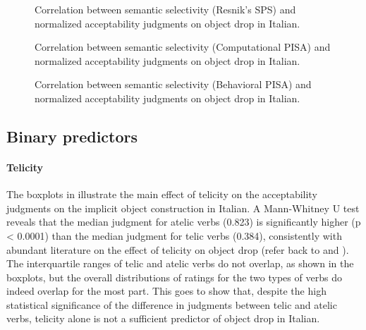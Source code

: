 
\begin{figure}[htb]
\caption{Correlation between semantic selectivity (Resnik's SPS) and normalized acceptability judgments on object drop in Italian.}
    
\end{figure}

\begin{figure}[htb]
\caption{Correlation between semantic selectivity (Computational PISA) and normalized acceptability judgments on object drop in Italian.}
    
\end{figure}

\begin{figure}[htb]
\caption{Correlation between semantic selectivity (Behavioral PISA) and normalized acceptability judgments on object drop in Italian.}
    
\end{figure}


\subsection{Binary predictors} 

\paragraph{Telicity}
The boxplots in  illustrate the main effect of telicity on the acceptability judgments on the implicit object construction in Italian. A Mann-Whitney U test reveals that the median judgment for atelic verbs (0.823) is significantly higher (p < 0.0001) than the median judgment for telic verbs (0.384), consistently with abundant literature on the effect of telicity on object drop (refer back to  and ).\\
The interquartile ranges of telic and atelic verbs do not overlap, as shown in the boxplots, but the overall distributions of ratings for the two types of verbs do indeed overlap for the most part. This goes to show that, despite the high statistical significance of the difference in judgments between telic and atelic verbs, telicity alone is not a sufficient predictor of object drop in Italian.

